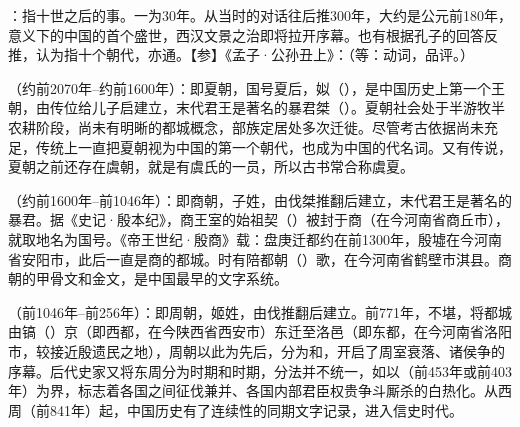 {
\item {}：指十世之后的事。一为30年。从当时的对话往后推300年，大约是公元前180年，意义下的中国的首个盛世，西汉文景之治即将拉开序幕。也有根据孔子的回答反推，认为指十个朝代，亦通。【参】《孟子·公孙丑上》：（等：动词，品评。）


\item {}（约前2070年--约前1600年）：即夏朝，国号夏后，姒（），是中国历史上第一个王朝，由传位给儿子启建立，末代君王是著名的暴君桀（）。夏朝社会处于半游牧半农耕阶段，尚未有明晰的都城概念，部族定居处多次迁徙。尽管考古依据尚未充足，传统上一直把夏朝视为中国的第一个朝代，也成为中国的代名词。又有传说，夏朝之前还存在虞朝，就是有虞氏的一员，所以古书常合称虞夏。

（约前1600年--前1046年）：即商朝，子姓，由伐桀推翻后建立，末代君王是著名的暴君。据《史记·殷本纪》，商王室的始祖契（）被封于商（在今河南省商丘市），就取地名为国号。《帝王世纪·殷商》载：盘庚迁都约在前1300年，殷墟在今河南省安阳市，此后一直是商的都城。时有陪都朝（）歌，在今河南省鹤壁市淇县。商朝的甲骨文和金文，是中国最早的文字系统。%

（前1046年--前256年）：即周朝，姬姓，由伐推翻后建立。前771年，不堪，将都城由镐（）京（即西都，在今陕西省西安市）东迁至洛邑（即东都，在今河南省洛阳市，较接近殷遗民之地），周朝以此为先后，分为和，开启了周室衰落、诸侯争的序幕。后代史家又将东周分为时期和时期，分法并不统一，如以（前453年或前403年）为界，标志着各国之间征伐兼并、各国内部君臣权贵争斗厮杀的白热化。从西周（前841年）起，中国历史有了连续性的同期文字记录，进入信史时代。%

}
